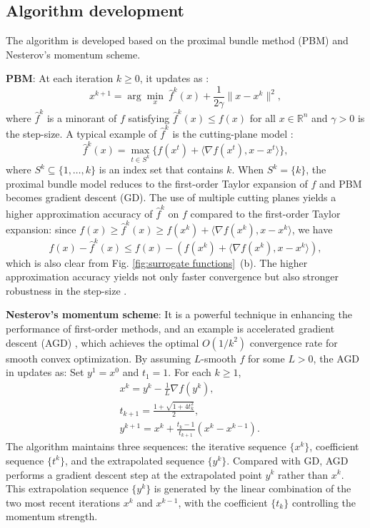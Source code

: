 \documentclass[letterpaper, 10 pt, conference]{ieeeconf}  %
\newcommand{\R}{{\mathbb{R}}}
\begin{document}
\subsection{Algorithm development}
The algorithm is developed based on the proximal bundle method (PBM) and Nesterov's momentum scheme.

    {\bf PBM}: At each iteration $k\ge 0$, it updates as \cite{diaz2023optimal, Nesterov2021memory}:
\begin{equation*}
    x^{k+1} = \arg\min_x ~ \hat{f}^k(x) + \frac{1}{2\gamma}\|x-x^k\|^2,
\end{equation*}
where $\hat{f}^k$ is a minorant of $f$ satisfying $\hat{f}^k(x)\le f(x)$ for all $x\in\R^n$ and $\gamma>0$ is the step-size. A typical example of $\hat{f}^k$ is the cutting-plane model \cite{kelley1960cutting}: 
\begin{equation*}
    \hat{f}^k(x)  = \max_{t\in S^k} \{ f(x^t) + \langle \nabla f(x^t),x-x^t \rangle\},
\end{equation*}
where $S^k \subseteq \{ 1,\dots,k\}$ is an index set that contains $k$. When $S^k = \{k\}$, the proximal bundle model reduces to the first-order Taylor expansion of $f$ and PBM becomes gradient descent (GD). The use of multiple cutting planes yields a higher approximation accuracy of $\hat{f}^k$ on $f$ compared to the first-order Taylor expansion: since $f(x) \geq \hat{f}^k(x) \geq f(x^k) + \langle \nabla f(x^k),x-x^k\rangle$, we have 
\[ f(x) - \hat{f}^k(x) \leq f(x) - (f(x^k) + \langle \nabla f(x^k),x-x^k\rangle), \]
which is also clear from Fig. \ref{fig:surrogate functions}~(b). The higher approximation accuracy yields not only faster convergence but also stronger robustness in the step-size \cite{lemarechal1993convex}.


{\bf Nesterov’s momentum scheme}: It is a powerful technique in enhancing the performance of first-order methods, and an example is accelerated gradient descent (AGD) \cite{nesterov1983method,Beck09FISTA,d2021acceleration}, which achieves the optimal $O(1/k^2)$ convergence rate for smooth convex optimization. By assuming $L$-smooth $f$ for some $L>0$, the AGD in \cite{Beck09FISTA} updates as: Set $y^1=x^0$ and $t_1=1$. For each $k\ge 1$,
\begin{align}
    &x^k = y^k - \frac{1}{L}\nabla f(y^k),\label{eq:AGD-x} \\
    &t_{k+1} = \frac{1+ \sqrt{1+4t_k^2}}{2}, \label{eq:AGD-t} \\
    &y^{k+1} = x^k  + \frac{t_k-1}{t_{k+1}}(x^k-x^{k-1}).\label{eq:AGD-y}
\end{align}
The algorithm maintains three sequences: the iterative sequence $\{x^k\}$, coefficient sequence $\{t^k\}$, and the extrapolated sequence $\{y^k\}$. Compared with GD, AGD performs a gradient descent step at the extrapolated point $y^k$ rather than $x^k$. This extrapolation sequence $\{y^k\}$ is generated by the linear combination of the two most recent iterations $x^k$ and $x^{k-1}$, with the coefficient $\{ t_k\}$ controlling the momentum strength.
\end{document}

